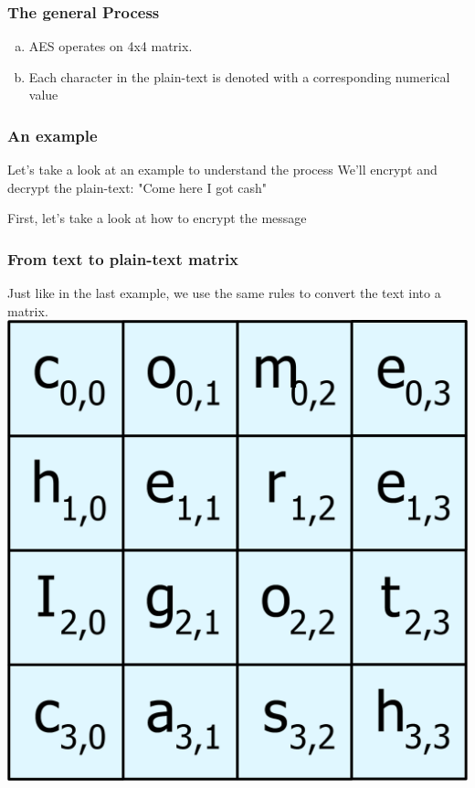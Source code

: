 \documentclass[11pt]{beamer}
\begin{document}
\begin{frame}\frametitle{The general Process}
	\begin{enumerate}[a.]
	\item AES operates on 4x4 matrix.
	\item Each character in the plain-text is denoted with a corresponding numerical value
	\end{enumerate}
\end{frame}

\begin{frame}\frametitle{An example}
\center Let's take a look at an example to understand the process
\center We'll encrypt and decrypt the plain-text:
\center "Come here I got cash"

\end{frame}

\begin{frame}
\center First, let's take a look at how to encrypt the message
\end{frame}

\begin{frame}\frametitle{From text to plain-text matrix}
	Just like in the last example, we use the same rules to convert the text into a matrix. 
	\center \includegraphics[scale=0.3]{initial_matrix_1}

\end{frame}
\end{document}
